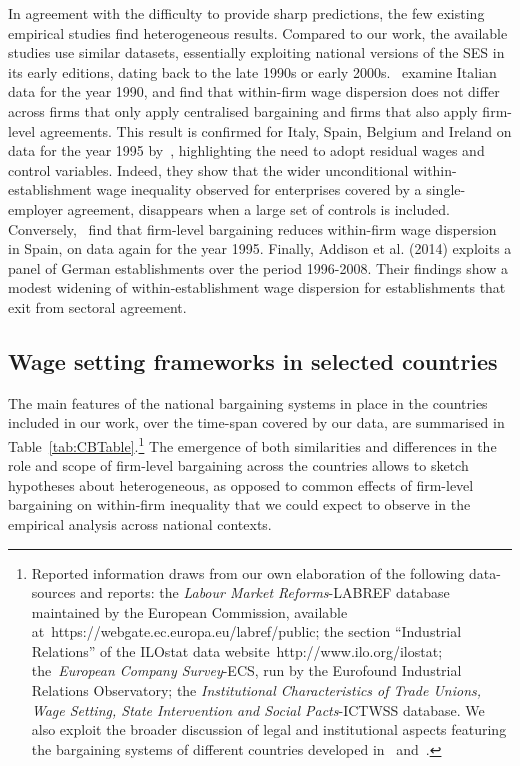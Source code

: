 \documentclass[12pt]{article}
\begin{document}
In agreement with the difficulty to provide sharp predictions, the few existing empirical studies find heterogeneous results. Compared to our work, the available studies use similar datasets, essentially exploiting national versions of the SES in its early editions, dating back to the late 1990s or early 2000s.~\cite{dellaringa.lucifora.1994} examine Italian data for the year 1990, and find that within-firm wage dispersion does not differ across firms that only apply centralised bargaining and firms that also apply firm-level agreements. This result is confirmed for Italy, Spain, Belgium and Ireland on data for the year 1995 by~\cite{dellaringa.lucifora.ea.2004}, highlighting the need to adopt residual wages and control variables. Indeed, they show that the wider unconditional within-establishment wage inequality observed for enterprises covered by a single-employer agreement, disappears when a large set of controls is included. Conversely,~\cite{canaldominguez.gutierrez.2004} find that firm-level bargaining
reduces within-firm wage dispersion in Spain, on data again for the year 1995. Finally, Addison et al. (2014) exploits a panel of German establishments over the period 1996-2008. Their findings show a modest widening of within-establishment wage dispersion for establishments that exit from sectoral agreement.



\subsection{Wage setting frameworks in selected countries}

The main features of the national bargaining systems in place in the countries included in our work, over the time-span covered by our data, are summarised in Table~\ref{tab:CBTable}.\footnote{Reported information draws from our own elaboration of the following data-sources and reports: the \textit{Labour Market Reforms}-LABREF database maintained by the European Commission, available at~https://webgate.ec.europa.eu/labref/public; the section “Industrial Relations” of the ILOstat data website~http://www.ilo.org/ilostat; the~\textit{European Company Survey}-ECS, run by the Eurofound Industrial Relations Observatory; the \textit{Institutional Characteristics of Trade Unions, Wage Setting, State Intervention and Social Pacts}-ICTWSS database. We also exploit the broader discussion of legal and institutional aspects featuring the bargaining systems of different countries developed in~\cite{fulton.2013,fulton.2015} and~\cite{visser2013wage}.} The emergence of both similarities and differences in the role and scope of firm-level bargaining across the countries allows to sketch hypotheses about heterogeneous, as opposed to common effects of firm-level bargaining on within-firm inequality that we could expect to observe in the empirical analysis across national contexts.
\end{document}
